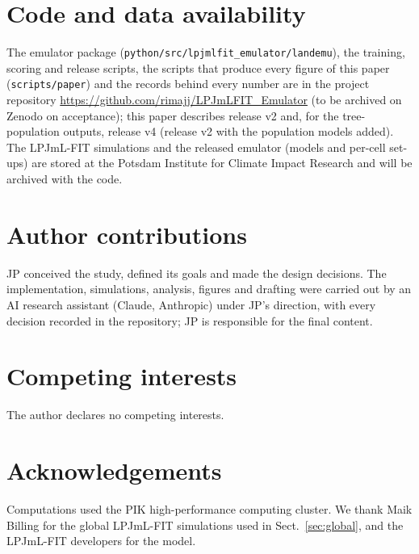 \documentclass[11pt,a4paper]{article}
\begin{document}
\section*{Code and data availability}
The emulator package (\texttt{python/src/lpjmlfit\_emulator/landemu}), the training, scoring and release scripts, the
scripts that produce every figure of this paper (\texttt{scripts/paper}) and the records behind every number are in the
project repository \url{https://github.com/rimajj/LPJmLFIT_Emulator} (to be archived on Zenodo on acceptance); this
paper describes release v2 and, for the tree-population outputs, release v4 (release v2 with the population models
added). The LPJmL-FIT simulations and the released emulator (models and per-cell set-ups) are
stored at the Potsdam Institute for Climate Impact Research and will be archived with the code.

\section*{Author contributions}
JP conceived the study, defined its goals and made the design decisions. The implementation, simulations, analysis,
figures and drafting were carried out by an AI research assistant (Claude, Anthropic) under JP's direction, with every
decision recorded in the repository; JP is responsible for the final content.

\section*{Competing interests}
The author declares no competing interests.

\section*{Acknowledgements}
Computations used the PIK high-performance computing cluster. We thank Maik Billing for the global LPJmL-FIT
simulations used in Sect.~\ref{sec:global}, and the LPJmL-FIT developers for the model.



\end{document}
